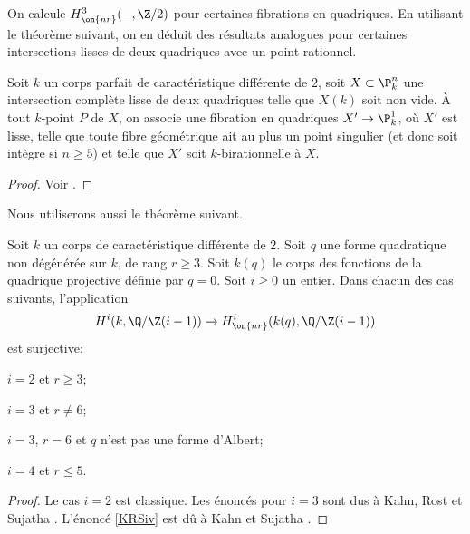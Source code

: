 On calcule $H^3_{\on{nr}}(-,\Z/2)$ pour certaines fibrations en quadriques. En utilisant le théorème suivant, on en déduit des résultats analogues pour certaines intersections lisses de deux quadriques avec un point rationnel.

\begin{thm}\label{theorem3.2}
Soit $k$ un corps parfait de caractéristique différente de $2$, soit \hbox{$X\subset \P^n_k$} une intersection complète lisse de deux quadriques telle que $X(k)$ soit non vide. À tout $k$-point $P$ de $X$, on associe une fibration en quadriques $X'\to\P^1_k$, où $X'$ est lisse, telle que toute fibre géométrique ait au plus un point singulier (et donc soit intègre si $n\geq 5$) et telle que $X'$ soit $k$-birationnelle à $X$.
\end{thm}

\begin{proof}
Voir \cite[Th.\,3.2, (3.4) p.\,61, Rem.\,1.13.1]{colliot1987intersectionsI}.
\end{proof}

Nous utiliserons aussi le théorème suivant.
\begin{thm}\label{KRS}
Soit $k$ un corps de caractéristique différente de $2$.
Soit $q$ une forme quadratique non dégénérée sur $k$, de rang $r\geq 3$. Soit $k(q)$ le corps des fonctions de la quadrique projective définie par $q=0$.
Soit $i \geq 0$ un entier. Dans chacun des cas suivants, l'application
\[
H^{i}(k,\Q/\Z(i-1)) \to H^{i}_{\on{nr}}(k(q), \Q/\Z(i-1))
\]
est surjective:
\begin{enumeratei}
\item\label{KRSi}
$i=2$ et $r\geq 3$;

\item\label{KRSii}
$i=3$ et $r\neq 6$;

\item\label{KRSiii}
$i=3$, $r=6$ et $q$ n'est pas une forme d'Albert;

\item\label{KRSiv}
$i=4$ et $r\leq 5$.
\end{enumeratei}
\end{thm}

\begin{proof} Le cas $i=2$ est classique. Les énoncés pour $i=3$ sont dus à Kahn, Rost et Sujatha \cite[Th.\,5, Cor.\,10(2)]{kahn1998unramified}. L'énoncé \eqref{KRSiv} est dû à Kahn et Sujatha \cite[Th.\,3]{kahnsuja1998unramified}.
\end{proof}

